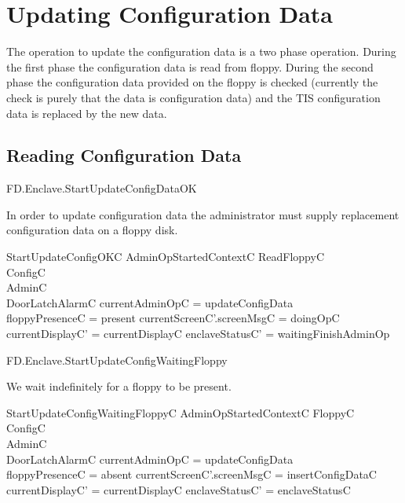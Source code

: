 \section{Updating Configuration Data}

The operation to update the configuration data is a two phase
operation. During the first phase the configuration data is read from
floppy. During the second phase the configuration data provided on the
floppy is checked (currently the check is purely that the data is
configuration data) and the TIS configuration data is replaced by the
new data.


\subsection{Reading Configuration Data}

\begin{traceunit}{FD.Enclave.StartUpdateConfigDataOK}
\end{traceunit}


In order to update configuration data the administrator must supply
replacement configuration data on a floppy disk.


\begin{schema}{StartUpdateConfigOKC}
        AdminOpStartedContextC
\also   
        ReadFloppyC
\\      \Xi ConfigC
\\      \Xi AdminC     
\\      \Xi DoorLatchAlarmC
\where
       \The currentAdminOpC = updateConfigData
\\      floppyPresenceC = present
\also
        currentScreenC'.screenMsgC = doingOpC
\\      currentDisplayC' = currentDisplayC
\also
        enclaveStatusC' = waitingFinishAdminOp
\end{schema}

\begin{traceunit}{FD.Enclave.StartUpdateConfigWaitingFloppy}
\end{traceunit}


We wait indefinitely for a floppy to be present.

\begin{schema}{StartUpdateConfigWaitingFloppyC}
        AdminOpStartedContextC
\also   
        \Xi FloppyC    
\\      \Xi ConfigC
\\      \Xi AdminC 
\\      \Xi DoorLatchAlarmC
\where
        \The currentAdminOpC = updateConfigData
\\      floppyPresenceC = absent
\also
        currentScreenC'.screenMsgC = insertConfigDataC
\\      currentDisplayC' = currentDisplayC
\also
        enclaveStatusC' = enclaveStatusC
\end{schema}

